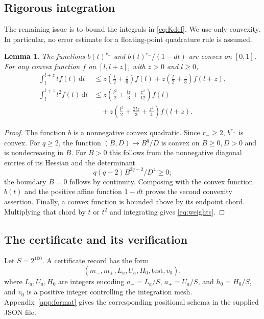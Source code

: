 \documentclass[11pt,letterpaper,reqno]{amsart}
\newtheorem{lem}[thm]{Lemma}
\theoremstyle{definition}
\numberwithin{equation}{section}
\newcommand{\dd}{\,\mathrm d}
\begin{document}
\subsection{Rigorous integration}
The remaining issue is to bound the integrals in \eqref{eq:Kdef}. We use only convexity. In particular, no error estimate for a floating-point quadrature rule is assumed.

\begin{lem}\label{lem:quadrature}
The functions $b(t)^{r_-}$ and $b(t)^{r_-}/(1-dt)$ are convex on $[0,1]$. For any convex function $f$ on $[l,l+z]$, with $z>0$ and $l\ge0$,
\begin{equation}\label{eq:weights}
 \begin{aligned}
 \int_l^{l+z}tf(t)\dd t
 &\le z\left(\frac l2+\frac z6\right)f(l)
      +z\left(\frac l2+\frac z3\right)f(l+z),\\
 \int_l^{l+z}t^2f(t)\dd t
 &\le z\left(\frac{l^2}2+\frac{lz}3+\frac{z^2}{12}\right)f(l)\\
 &\quad+z\left(\frac{l^2}2+\frac{2lz}3+\frac{z^2}4\right)f(l+z).
 \end{aligned}
\end{equation}
\end{lem}

\begin{proof}
The function $b$ is a nonnegative convex quadratic. Since $r_-\ge2$, $b^{r_-}$ is convex. For $q\ge2$, the function $(B,D)\mapsto B^q/D$ is convex on $B\ge0,D>0$ and is nondecreasing in $B$. For $B>0$ this follows from the nonnegative diagonal entries of its Hessian and the determinant
\[
 q(q-2)B^{2q-2}/D^4\ge0;
\]
the boundary $B=0$ follows by continuity. Composing with the convex function $b(t)$ and the positive affine function $1-dt$ proves the second convexity assertion. Finally, a convex function is bounded above by its endpoint chord. Multiplying that chord by $t$ or $t^2$ and integrating gives \eqref{eq:weights}.
\end{proof}

\subsection{The certificate and its verification}
Let $S=2^{100}$. A certificate record has the form
\[
 (m_-,m_+,L_a,U_a,H_0,\text{test},v_0),
\]
where $L_a,U_a,H_0$ are integers encoding
$a_-=L_a/S$, $a_+=U_a/S$, and $h_0=H_0/S$, and $v_0$ is a positive integer controlling the integration mesh. Appendix~\ref{app:format} gives the corresponding positional schema in the supplied JSON file.
\end{document}
